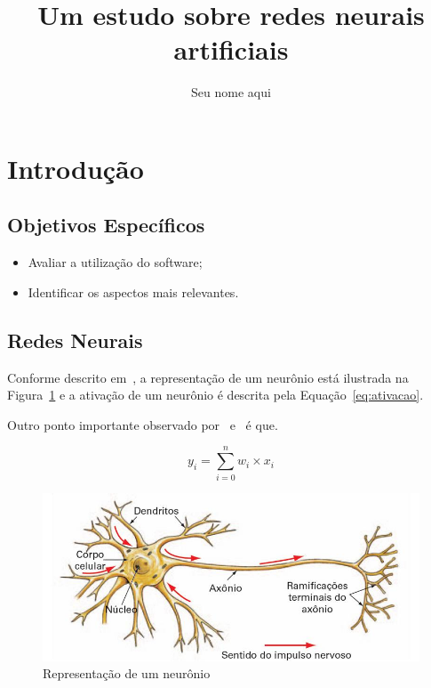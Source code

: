 \documentclass[a4paper, 12pt]{article}
\author{Seu nome aqui}
\title{Um estudo sobre redes neurais artificiais}
\begin{document}
	\maketitle
\section{Introdução}
\subsection{Objetivos Específicos}
\begin{itemize}
	\item Avaliar a utilização do software;
	\item Identificar os aspectos mais relevantes.
\end{itemize}
\subsection{Redes Neurais}
Conforme descrito em~\cite{haykinredes}, a representação de um neurônio está ilustrada na Figura~\ref{fig:neuronio} e a ativação de um neurônio é descrita pela Equação~\ref{eq:ativacao}.

Outro ponto importante observado por~\cite{LeCun1990} e~\cite{murdocca} é que.


\begin{equation}
y_i = \sum_{i=0}^{n} w_i \times x_i
\end{equation}\label{eq:ativacao}

\begin{figure}[htb]
	\centering
	\includegraphics[scale=.3]{neuronio}
	\caption{Representação de um neurônio}\label{fig:neuronio}
\end{figure}



\end{document}
